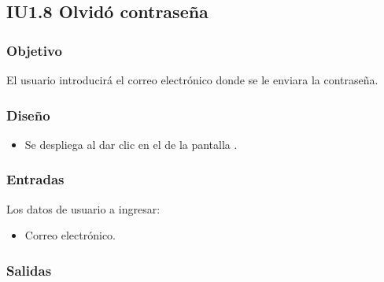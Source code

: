 \newpage
\subsection{IU1.8 Olvidó contraseña}

\subsubsection{Objetivo}
	El usuario introducirá el correo electrónico donde se le enviara la contraseña.
\subsubsection{Diseño}
	\begin{itemize}
		\item Se despliega al dar clic en el  de la pantalla .
\end{itemize}		


\subsubsection{Entradas}
Los datos de usuario a ingresar:
\begin{itemize}
	\item Correo electrónico.
\end{itemize}

\subsubsection{Salidas}
\begin{Citemize}
	\item {}
	\item {}
	\item {}
\end{Citemize}
